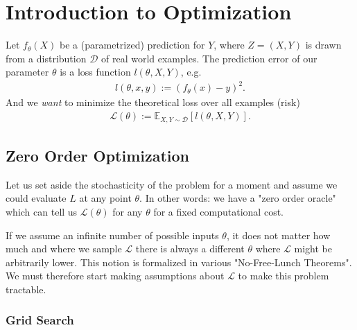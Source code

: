 \newcommand{\loss}{\mathcal{L}}
\newcommand{\weights}{\theta}
\newcommand{\dist}{\mathcal{D}}
\newcommand{\E}{\mathbb{E}}
\newcommand{\lipConst}{L}
\newcommand{\dimension}{d}
\newcommand{\lossError}{\epsilon}

\chapter{Introduction to Optimization}


Let \(f_\weights(X)\) be a (parametrized) prediction for \(Y\), where \(Z=(X,Y)\)
is drawn from a distribution \(\dist\) of real world examples. The prediction
error of our parameter \(\weights\) is a loss function \(l(\weights, X, Y)\), e.g. 
%
\begin{align*}
	l(\weights, x, y) := (f_\weights(x) - y)^2.
\end{align*}
%
And we \emph{want} to minimize the theoretical loss over all examples (risk)
%
\begin{align*}
	\loss(\weights) := \E_{X,Y\sim \dist} [l(\weights, X, Y)].
\end{align*}

\section{Zero Order Optimization}

Let us set aside the stochasticity of the problem for a moment and assume we
could evaluate \(L\) at any point \(\weights\). In other words: we have a "zero
order oracle" which can tell us \(\loss(\weights)\) for any \(\weights\) for a fixed
computational cost.

If we assume an infinite number of possible inputs \(\weights\), it does not matter
how much and where we sample \(\loss\) there is always a different \(\weights\) where
\(\loss\) might be arbitrarily lower. This notion is formalized in various "No-Free-Lunch
Theorems". We must therefore start making assumptions about \(\loss\) to make this
problem tractable.

\subsection{Grid Search}


